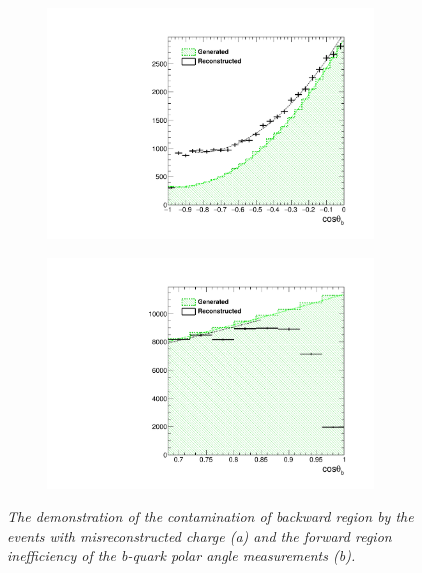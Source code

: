 \begin{figure}
	\centering
	\begin{subfigure}{0.5\textwidth}
		\includegraphics[width=0.95\textwidth]{ILD/plots/basymmetry-zoom-contamination.pdf}
		\caption{\label{fig:BAsymmetryProblem_a_3} }
	\end{subfigure}%
	\begin{subfigure}{0.5\textwidth}
		\centering
		\includegraphics[width=0.95\textwidth]{ILD/plots/basymmetry-zoom-inefficiency.pdf}
		\caption{\label{fig:BAsymmetryProblem_b_3} }
	\end{subfigure}
	\caption{\sl The demonstration of the contamination of backward region by the events with misreconstructed charge (a) and the forward region inefficiency of the b-quark polar angle measurements (b). }
	\label{fig:BAsymmetryProblem_3}
\end{figure}

